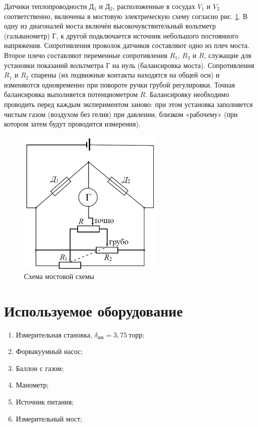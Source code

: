 \documentclass[a4paper, 12pt]{article}
\begin{document}
Датчики теплопроводности Д$ _1 $ и Д$ _2 $, расположенные в сосудах $ V_1 $ и $ V_2 $ соответственно, включены в мостовую электрическую схему согласно рис. \ref{ris5}. В одну из диагоналей моста включён высокочувствительный вольтметр (гальванометр) Г, к другой подключается источник небольшого постоянного напряжения. Сопротивления проволок датчиков составляют одно из плеч моста. Второе плечо составляют переменные сопротивления $ R_1 $, $ R_2 $ и $ R $, служащие для установки показаний вольтметра Г на нуль (балансировка моста). Сопротивления $ R_1 $ и $ R_2 $ спарены (их подвижные контакты находятся на общей оси) и изменяются одновременно при повороте ручки грубой регулировки. Точная балансировка выполняется потенциометром $ R $. Балансировку необходимо проводить перед каждым экспериментом заново: при этом установка заполняется чистым газом (воздухом без гелия) при давлении, близком «рабочему» (при котором затем будут проводится измерения).

\begin{figure}[h]
	\begin{center}
		\includegraphics[width=7cm]{ris5.jpg}
	\end{center}
	\caption{Схема мостовой схемы}
	\label{ris5}
\end{figure}

\section{Используемое оборудование}

\begin{enumerate}
    \item Измерительная становка, $\delta_{шк} = 3,75~торр$;
    \item Форвакуумный насос;
    \item Баллон с газом;
    \item Манометр;
    \item Источник питания;
    \item Измерительный мост;
\end{enumerate}
\end{document}
